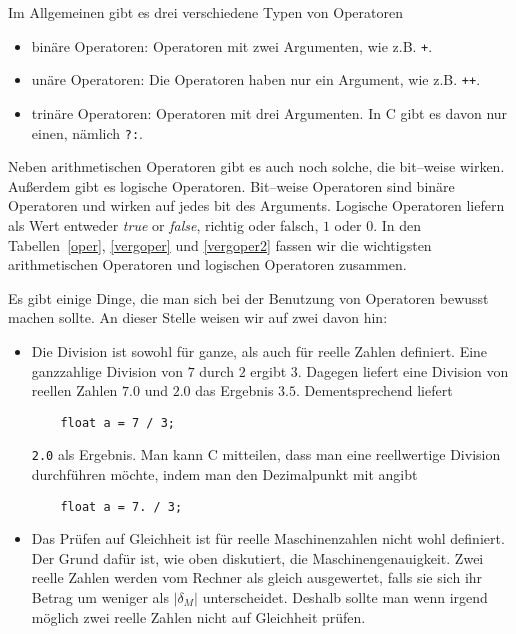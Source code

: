 Im Allgemeinen gibt es drei verschiedene Typen von Operatoren
\begin{itemize}
\item binäre Operatoren: Operatoren mit zwei Argumenten, wie z.B. \verb|+|.
\item unäre Operatoren: Die Operatoren haben nur ein Argument, wie z.B. \verb|++|.
\item trinäre Operatoren: Operatoren mit drei Argumenten. In C gibt es davon nur einen, nämlich \verb|?:|.
\end{itemize} 
Neben arithmetischen Operatoren gibt es auch noch solche, die bit--weise wirken. 
Außerdem gibt es logische Operatoren.
Bit--weise Operatoren sind binäre Operatoren und wirken auf jedes bit des Arguments.
Logische Operatoren liefern als Wert entweder \emph{true} or \emph{false}, richtig oder falsch, $1$ oder $0$.
In den Tabellen~\ref{oper}, \ref{vergoper} und \ref{vergoper2} fassen wir die wichtigsten arithmetischen Operatoren und logischen Operatoren zusammen.

Es gibt einige Dinge, die man sich bei der Benutzung von Operatoren bewusst machen sollte.
An dieser Stelle weisen wir auf zwei davon hin:
\begin{itemize}
\item Die Division ist sowohl für ganze, als auch für reelle Zahlen definiert. 
  Eine ganzzahlige Division von $7$ durch $2$ ergibt $3$.
  Dagegen liefert eine Division von reellen Zahlen $7.0$ und $2.0$ das Ergebnis $3.5$.
  Dementsprechend liefert
  \begin{lstlisting}
    float a = 7 / 3;
  \end{lstlisting}
  \verb|2.0| als Ergebnis. 
  Man kann C mitteilen, dass man eine reellwertige Division durchführen möchte, indem man den Dezimalpunkt mit angibt
  \begin{lstlisting}
    float a = 7. / 3;
  \end{lstlisting}
  
\item Das Prüfen auf Gleichheit ist für reelle Maschinenzahlen nicht wohl definiert.
  Der Grund dafür ist, wie oben diskutiert, die Maschinengenauigkeit.
  Zwei reelle Zahlen werden vom Rechner als gleich ausgewertet, falls sie sich ihr Betrag um weniger als $|\delta_M|$ unterscheidet. 
  Deshalb sollte man wenn irgend möglich zwei reelle Zahlen nicht auf Gleichheit prüfen.

\end{itemize}


